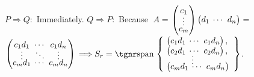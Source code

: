 \parSol{}
$P\Rightarrow Q:$ \;Immediately.\parSol{\vspace{-18pt}}
$Q\Rightarrow P:$ \;Because $\;A={}${\normalsize$\begin{pmatrix}c_1 \\[-4pt] \vdots \\[-5pt] c_m \end{pmatrix}\begin{pmatrix}d_1 & \hspace{-6pt}\cdots & \hspace{-6pt}d_n\end{pmatrix}$}${}={}${\normalsize$\begin{pmatrix} c_1 d_1 & \hspace{-6pt}\cdots & \hspace{-6pt}c_1 d_n\\[-4pt] \vdots & \hspace{-6pt}\ddots & \hspace{-6pt}\vdots \\[-5pt] c_m d_1 & \hspace{-6pt}\cdots & \hspace{-6pt}c_m d_n \end{pmatrix}$} $\Longrightarrow S_r=\Spn${\normalsize\envFontSmall$\MathLeftrightBrace{l}{
	\!\begin{pmatrix}c_1 d_1 & \hspace{-6pt}\cdots & \hspace{-6pt}c_1 d_n\end{pmatrix},\\
	\!\begin{pmatrix} c_2 d_1 & \hspace{-6pt}\cdots & \hspace{-6pt}c_2 d_n\end{pmatrix},\\[-6pt] \;\;\;\qquad\vdots\\[-6pt]
	\!\begin{pmatrix} c_m d_1 & \hspace{-6pt}\cdots & \hspace{-6pt}c_m d_n\end{pmatrix}
}%
$}.\parSol{\vspace{-8pt}}

